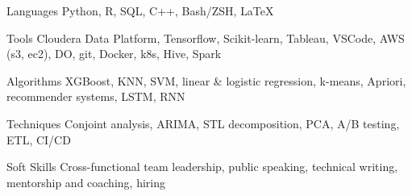 

\begin{cvskills}

  \cvskill
    {Languages} %
    {Python, R, SQL, C++, Bash/ZSH, {\LaTeX{}}} %

  \cvskill
    {Tools} %
    {Cloudera Data Platform, Tensorflow, Scikit-learn, Tableau, VSCode, AWS (s3, ec2), DO, git, Docker, k8s, Hive, Spark} %

  \cvskill
    {Algorithms} %
    {XGBoost, KNN, SVM, linear \& logistic regression, k-means, Apriori, recommender systems, LSTM, RNN} %

  \cvskill
    {Techniques} %
    {Conjoint analysis, ARIMA, STL decomposition, PCA, A/B testing, ETL, CI/CD} %

  \cvskill
    {Soft Skills} %
    {Cross-functional team leadership, public speaking, technical writing, mentorship and coaching, hiring} %

\end{cvskills}
